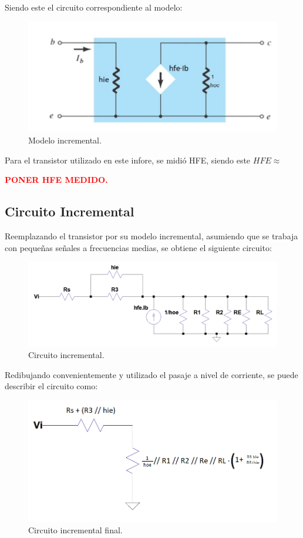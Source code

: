 \documentclass[a4paper]{article}
\begin{document}
Siendo este el circuito correspondiente al modelo:
\begin{figure} [H]
	\centering
	\includegraphics[width=\textwidth]{imagenes/modeloincremetnal.jpg}
	\caption{Modelo incremental.}
	\label{fig:modinc}
\end{figure}

Para el transistor utilizado en este infore, se midió HFE, siendo este $HFE \approx $
\begin{center}
	\textcolor{red}{\textbf{PONER HFE MEDIDO.}}
\end{center}

\subsection{Circuito Incremental}
Reemplazando el transistor por su modelo incremental, asumiendo que se trabaja con pequeñas señales a frecuencias medias, se obtiene el siguiente circuito:
\begin{figure} [H]
	\centering
	\includegraphics[width=\textwidth]{imagenes/circinc.png}
	\caption{Circuito incremental.}
	\label{fig:circinc}
\end{figure}

Redibujando convenientemente y utilizado el pasaje a nivel de corriente, se puede describir el circuito como:
\begin{figure} [H]
	\centering
	\includegraphics[width=\textwidth]{imagenes/circinc2.png}
	\caption{Circuito incremental final.}
	\label{fig:circinc2}
\end{figure}
\end{document}
